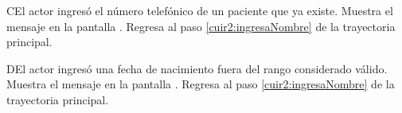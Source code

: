 \begin{UCtrayectoriaA}{C}{El actor ingresó el número telefónico de un paciente que ya existe.}
	\UCpaso[\UCsist] Muestra el mensaje  en la pantalla .
	\UCpaso[] Regresa al paso \ref{cuir2:ingresaNombre} de la trayectoria principal.
\end{UCtrayectoriaA}

\begin{UCtrayectoriaA}{D}{El actor ingresó una fecha de nacimiento fuera del rango considerado válido.}
	\UCpaso[\UCsist] Muestra el mensaje  en la pantalla .
	\UCpaso[] Regresa al paso \ref{cuir2:ingresaNombre} de la trayectoria principal.
\end{UCtrayectoriaA}